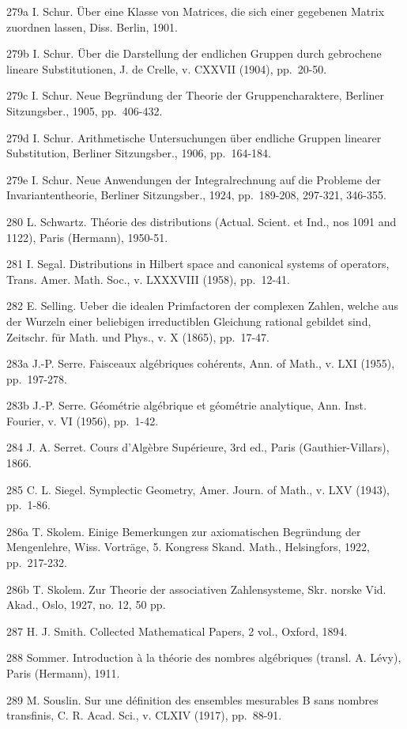 279a I. Schur. Über eine Klasse von Matrices, die sich einer gegebenen Matrix zuordnen lassen, Diss. Berlin, 1901.

279b I. Schur. Über die Darstellung der endlichen Gruppen durch gebrochene lineare Substitutionen, J. de Crelle, v. CXXVII (1904), pp.~20-50.

279c I. Schur. Neue Begründung der Theorie der Gruppencharaktere, Berliner Sitzungsber., 1905, pp.~406-432.

279d I. Schur. Arithmetische Untersuchungen über endliche Gruppen linearer Substitution, Berliner Sitzungsber., 1906, pp.~164-184.

279e I. Schur. Neue Anwendungen der Integralrechnung auf die Probleme der Invariantentheorie, Berliner Sitzungsber., 1924, pp.~189-208, 297-321, 346-355.

280 L. Schwartz. Théorie des distributions (Actual. Scient. et Ind., nos 1091 and 1122), Paris (Hermann), 1950-51.

281 I. Segal. Distributions in Hilbert space and canonical systems of operators, Trans. Amer. Math. Soc., v. LXXXVIII (1958), pp.~12-41.

282 E. Selling. Ueber die idealen Primfactoren der complexen Zahlen, welche aus der Wurzeln einer beliebigen irreductiblen Gleichung rational gebildet sind, Zeitschr. für Math. und Phys., v. X (1865), pp.~17-47.

283a J.-P. Serre. Faisceaux algébriques cohérents, Ann. of Math., v. LXI (1955), pp.~197-278.

283b J.-P. Serre. Géométrie algébrique et géométrie analytique, Ann. Inst. Fourier, v. VI (1956), pp.~1-42.

284 J. A. Serret. Cours d'Algèbre Supérieure, 3rd ed., Paris (Gauthier-Villars), 1866.

285 C. L. Siegel. Symplectic Geometry, Amer. Journ. of Math., v. LXV (1943), pp.~1-86.

286a T. Skolem. Einige Bemerkungen zur axiomatischen Begründung der Mengenlehre, Wiss. Vorträge, 5. Kongress Skand. Math., Helsingfors, 1922, pp.~217-232.

286b T. Skolem. Zur Theorie der associativen Zahlensysteme, Skr. norske Vid. Akad., Oslo, 1927, no. 12, 50 pp.

287 H. J. Smith. Collected Mathematical Papers, 2 vol., Oxford, 1894.

288 Sommer. Introduction à la théorie des nombres algébriques (transl. A. Lévy), Paris (Hermann), 1911.

289 M. Souslin. Sur une définition des ensembles mesurables B sans nombres transfinis, C. R. Acad. Sci., v. CLXIV (1917), pp.~88-91.

